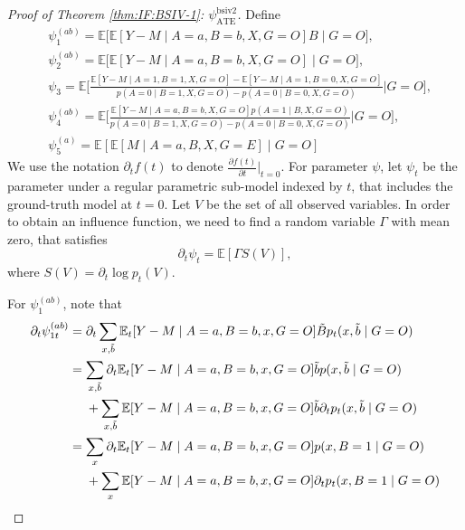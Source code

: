 \documentclass[10pt]{article}
\newcommand{\E}{\mathbb{E}}
\begin{document}
\begin{proof}[Proof of Theorem \ref{thm:IF:BSIV-1}: $\psi_{\text{ATE}}^{\text{bsiv2}}$]
	
Define
\begin{align*}
        &\psi_1^{(ab)}=\mathbb{E}\big[\mathbb{E}[Y-M\mid A=a,B=b,X,G=O]B\mid G=O\big],\\
    &\psi_2^{(ab)}=\mathbb{E}\big[\mathbb{E}[Y-M\mid A=a,B=b,X,G=O]\mid G=O\big],\\
    &\psi_3=\mathbb{E}\bigg[\frac{\mathbb{E}[Y-M\mid A=1,B=1,X,G=O]-\mathbb{E}[Y-M\mid A=1,B=0,X,G=O]}{p(A=0\mid B=1,X,G=O)-p(A=0\mid B=0,X,G=O)}\bigg|G=O\bigg],\\
    &\psi_4^{(ab)}=\mathbb{E}\bigg[\frac{\mathbb{E}[Y-M\mid A=a,B=b,X,G=O]p(A=1\mid B,X,G=O)}{p(A=0\mid B=1,X,G=O)-p(A=0\mid B=0,X,G=O)}\bigg|G=O\bigg],\\
    &\psi_5^{(a)}=\mathbb{E}[\mathbb{E}[M\mid A=a,B,X,G=E]\mid G=O]
    \end{align*}
We use the notation $\partial_tf(t)$ to denote $\frac{\partial f(t)}{\partial t}\big|_{t=0}$.
For parameter $\psi$, let $\psi_t$ be the parameter under a regular parametric sub-model indexed by $t$, that includes the ground-truth model at $t=0$.
Let $V$ be the set of all observed variables.
In order to obtain an influence function, we need to find a random variable $\Gamma$ with mean zero, that satisfies
\[
\partial_t\psi_t=\E[\Gamma S(V)],
\]
where $S(V)=\partial_t\log p_t(V)$.	


    For $\psi_1^{(ab)}$, note that
\begin{align*}
    \partial_t\psi_{1t}^{(ab)}&=\partial_t\sum_{x,\Tilde{b}}\mathbb{E}_t[Y-M\mid A=a,B=b,x,G=O]\Tilde{B}p_t(x,\Tilde{b}\mid G=O)\\
    &=\sum_{x,\Tilde{b}}\partial_t\mathbb{E}_t[Y-M\mid A=a,B=b,x,G=O]\Tilde{b}p(x,\Tilde{b}\mid G=O)\\
    &\ \ \ \ + \sum_{x,\Tilde{b}}\mathbb{E}[Y-M\mid A=a,B=b,x,G=O]\Tilde{b}\partial_tp_t(x,\Tilde{b}\mid G=O)\\
    &=\sum_{x}\partial_t\mathbb{E}_t[Y-M\mid A=a,B=b,x,G=O]p(x,B=1\mid G=O)\\
    &\ \ \ \ + \sum_{x}\mathbb{E}[Y-M\mid A=a,B=b,x,G=O]\partial_tp_t(x,B=1\mid G=O)
\end{align*}


\end{proof}
\end{document}
